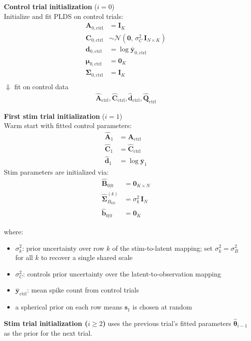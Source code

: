 \documentclass[11pt,letterpaper]{article} %
\begin{document}
\noindent
\begin{minipage}[t]{0.47\textwidth}
\textbf{Control trial initialization} ($i = 0$)\\[0.5em]
Initialize and fit PLDS on control trials:
\begin{align*}
    \bm{A}_{0, \mathrm{ctrl}} &= \bm{I}_K \\
    \bm{C}_{0, \mathrm{ctrl}} &\sim \mathcal{N}(\bm{0},\, \sigma_C^2\,\bm{I}_{N \times K}) \\
    \bm{d}_{0, \mathrm{ctrl}} &= \log\bar{\bm{y}}_{0, \mathrm{ctrl}} \\
    \boldsymbol{\mu}_{0, \mathrm{ctrl}} &= \bm{0}_K \\
    \boldsymbol{\Sigma}_{0, \mathrm{ctrl}} &= \bm{I}_K \\
\end{align*}
$\Downarrow$ fit on control data
\begin{align*}
    \hat{\bm{A}}_{\mathrm{ctrl}}, \hat{\bm{C}}_{\mathrm{ctrl}}, \hat{\bm{d}}_{\mathrm{ctrl}}, \hat{\bm{Q}}_{\mathrm{ctrl}}
\end{align*}
\end{minipage}
\hfill\vline\hfill
\begin{minipage}[t]{0.47\textwidth}
\textbf{First stim trial initialization} ($i = 1$)\\[0.5em]
Warm start with fitted control parameters:
\begin{align*}
    \hat{\bm{A}}_1 &= \hat{\bm{A}}_{\mathrm{ctrl}} \\
    \hat{\bm{C}}_1 &= \hat{\bm{C}}_{\mathrm{ctrl}} \\
    \hat{\bm{d}}_1 &= \log\bar{\bm{y}}_{1}
\end{align*}
Stim parameters are initialized via:
\begin{align*}
    \hat{\bm{B}}_{0|0} &= \bm{0}_{K \times N} \\
    \hat{\bm{\Sigma}}_{B_{0|0}}^{(k)} &= \sigma_k^2\,\bm{I}_N \\
    \hat{\bm{b}}_{0|0} &= \bm{0}_K
\end{align*}
\end{minipage}

\noindent where:

\begin{itemize}[itemsep=0em, topsep=0.2em]
    \item $\sigma_k^2$: prior uncertainty over row $k$ of the stim-to-latent mapping; set $\sigma_k^2 = \sigma_B^2$ for all $k$ to recover a single shared scale
    \item $\sigma_C^2$: controls prior uncertainty over the latent-to-observation mapping
    \item $\bar{\bm{y}}_{\mathrm{ctrl}}$: mean spike count from control trials
    \item a spherical prior on each row means $\bm{s}_1$ is chosen at random
\end{itemize}
\vspace{0.5cm}
\textbf{Stim trial initialization ($i \geq 2$)} uses the previous trial's fitted parameters $\hat{\boldsymbol{\theta}}_{i-1}$ as the prior for the next trial.
\end{document}
